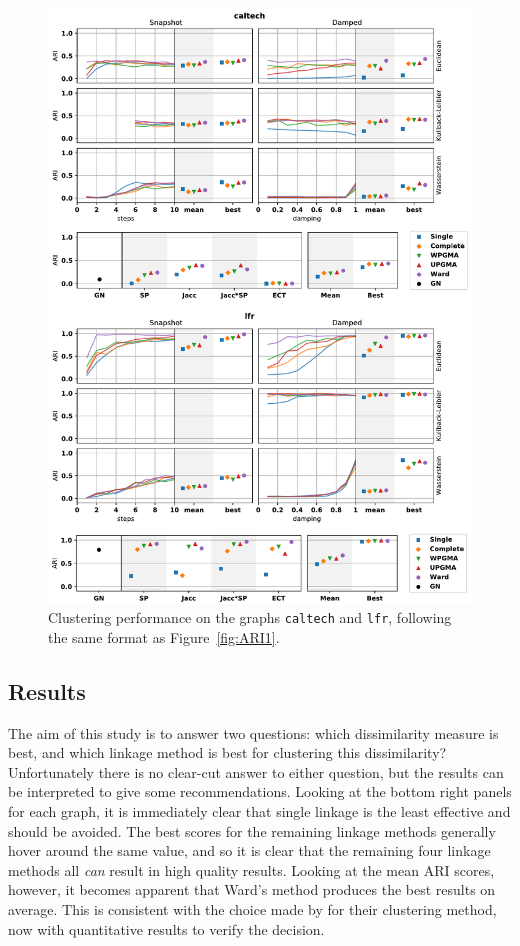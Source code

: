 \begin{figure}
  \centering
  \includegraphics[height=.95\textheight]{power/ARI2.pdf}
  \caption[Experimental clustering results for \texttt{caltech} and \texttt{lfr}]{Clustering performance on the graphs \texttt{caltech} and \texttt{lfr}, following the same format as Figure~\ref{fig:ARI1}.}
  \label{fig:ARI2}
\end{figure}

\subsection{Results}
The aim of this study is to answer two questions: which dissimilarity measure is best, and which linkage method is best for clustering this dissimilarity?
Unfortunately there is no clear-cut answer to either question, but the results can be interpreted to give some recommendations. Looking at the bottom right panels for each graph, it is immediately clear that single linkage is the least effective and should be avoided. The best scores for the remaining linkage methods generally hover around the same value, and so it is clear that the remaining four linkage methods all \emph{can} result in high quality results. Looking at the mean ARI scores, however, it becomes apparent that Ward's method produces the best results on average. This is consistent with the choice made by \citet{Pons2006} for their clustering method, now with quantitative results to verify the decision.

